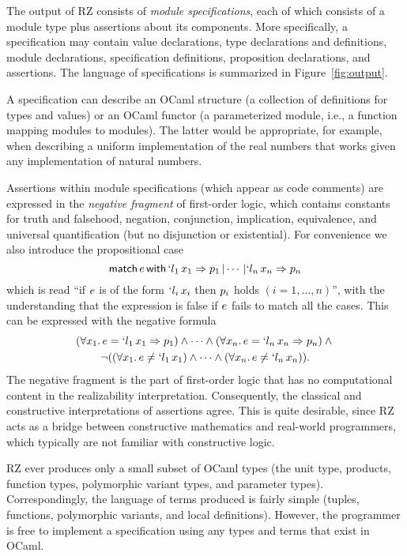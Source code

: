 The output of RZ consists of \emph{module specifications}, each of which consists of a module type
plus assertions about its components.  More specifically, a specification
may contain value declarations, type declarations and definitions, module
declarations, specification definitions, proposition declarations, and
assertions.  The language of specifications is summarized in
Figure~\ref{fig:output}.

A specification can describe an OCaml structure (a collection of 
definitions for types and values) or an OCaml functor (a parameterized
module, i.e., a function mapping modules to modules).  The latter would
be appropriate, for example, when describing a uniform implementation of the real numbers
that works given any implementation of natural numbers.

Assertions within module specifications (which appear as code comments)
are expressed in the \emph{negative fragment} of
first-order logic, which contains constants for truth and falsehood,
negation, conjunction, implication, equivalence, and universal
quantification (but no disjunction or existential). 
%
\iflong
For convenience we
also introduce the propositional case
%
\begin{equation*}
  \mathsf{match}\,e\,\mathsf{with}\,`l_1\,x_1\Rightarrow{p_1}\,|\cdots\,|`l_n\,x_n\Rightarrow{p_n}
\end{equation*}
%
which is read ``if $e$ is of the form $`l_i\,x_i$ then
$p_i$ holds $(i = 1, \ldots, n)$'', with the understanding that the
expression is false if $e$ fails to match all the cases. This can be
expressed with the negative formula
%
\begin{multline*}
  (\forall x_1.\, e = `l_1\,x_1 \Rightarrow p_1)
  \land \cdots \land
  (\forall x_n.\,e = `l_n\,x_n \Rightarrow p_n)
  \land {} \\
  \lnot ((\forall x_1.\, e \neq `l_1\,x_1) \land \cdots \land
  (\forall x_n.\, e \neq `l_n\,x_n)).
\end{multline*}
%
\fi %
%
The negative fragment is the part of first-order logic that has no
computational content in the realizability interpretation.
Consequently, the classical and constructive interpretations of
assertions agree. This is quite desirable, since RZ acts as a bridge
between constructive mathematics and real-world programmers, which
typically are not familiar with constructive logic.


RZ ever produces only a small subset of OCaml types (the unit type,
products, function types, polymorphic variant types, and parameter
types). Correspondingly, the language of terms produced is fairly simple
(tuples, functions, polymorphic variants, and local definitions).
However, the programmer is free to implement a specification using any
types and terms that exist in OCaml. 

